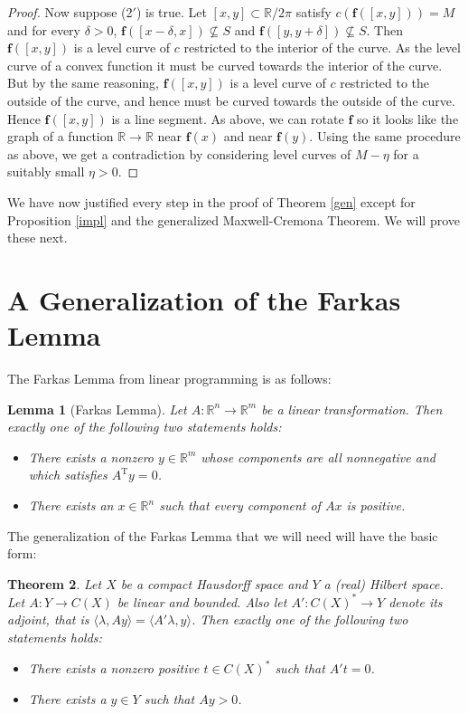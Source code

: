 \documentclass{amsart}
\newcommand{\R}			{\mathbb R}
\newcommand{\f}			{\mathbf f}
\newcommand{\map}		{\longrightarrow}
\newtheorem{theorem}{Theorem}[section]
\newtheorem{lemma}[theorem]{Lemma}
\numberwithin{equation}{section}
\begin{document}
\begin{proof}
Now suppose (2$'$) is true.  Let $[x,y]\subset\R/2\pi$ 
satisfy $c(\f([x,y]))=M$ and for every $\delta>0$, 
$\f([x-\delta,x])\nsubseteq S$ and $\f([y,y+\delta])\nsubseteq S$.  
Then $\f([x,y])$ is a level curve of $c$ restricted to 
the interior of the curve.  As the level curve of a 
convex function it must be curved towards the interior 
of the curve.  But by the same reasoning, $\f([x,y])$ 
is a level curve of $c$ restricted to the outside of 
the curve, and hence must be curved towards the outside 
of the curve.  Hence $\f([x,y])$ is a line segment.  
As above, we can rotate $\f$ so it looks like the graph 
of a function $\R\map\R$ near $\f(x)$ and near $\f(y)$.  Using 
the same procedure as above, we get a contradiction 
by considering level curves of $M-\eta$ for a suitably small $\eta>0$.
\end{proof}

We have now justified every step in the proof of Theorem 
\ref{gen} except for Proposition \ref{impl} and the generalized 
Maxwell-Cremona Theorem.  We will prove these next.

\section{A Generalization of the Farkas Lemma}\label{farkass}

The Farkas Lemma from linear programming is as follows:

\begin{lemma}[Farkas Lemma]\label{farkasl}
Let $A:\R^n\to\R^m$ be a linear transformation.  Then exactly 
one of the following two statements holds:
\begin{itemize}
\item[(1)] There exists a nonzero $y\in\R^m$ whose components 
are all nonnegative and which satisfies $A^{\operatorname{T}}y=0$.
\item[(2)] There exists an $x\in\R^n$ such that every component 
of $Ax$ is positive.
\end{itemize}
\end{lemma}

The generalization of the Farkas Lemma that we 
will need will have the basic form:

\begin{theorem}\label{farkas}
Let $X$ be a compact Hausdorff space and $Y$ a (real) Hilbert space.  
Let $A:Y\map C(X)$ be linear and bounded.  Also let $A':C(X)^*\map Y$ 
denote its adjoint, that is 
$\langle\lambda,Ay\rangle=\langle A'\lambda,y\rangle$.  Then 
exactly one of the following two statements holds:
\begin{itemize}
\item[(1)] There exists a nonzero positive $t\in C(X)^*$ such that $A't=0$.
\item[(2)] There exists a $y\in Y$ such that $Ay>0$.
\end{itemize}
\end{theorem}
\end{document}
